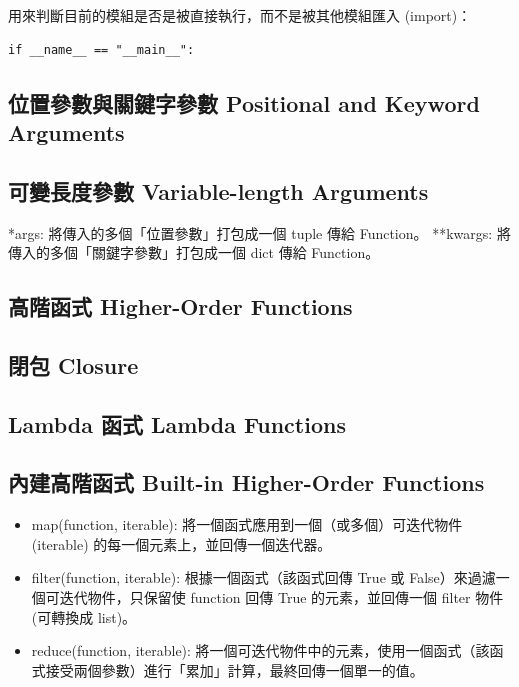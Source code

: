 \documentclass[a4paper,10pt,twocolumn,oneside]{article}
\begin{document}
用來判斷目前的模組是否是被直接執行，而不是被其他模組匯入 (import)：
\begin{verbatim}
if __name__ == "__main__":
\end{verbatim}
\subsection{位置參數與關鍵字參數 Positional and Keyword Arguments}


\subsection{可變長度參數 Variable-length Arguments}
*args: 將傳入的多個「位置參數」打包成一個 tuple 傳給 Function。
**kwargs: 將傳入的多個「關鍵字參數」打包成一個 dict 傳給 Function。


\subsection{高階函式 Higher-Order Functions}


\subsection{閉包 Closure}


\subsection{Lambda 函式 Lambda Functions}


\subsection{內建高階函式 Built-in Higher-Order Functions}
\begin{itemize}
    \item map(function, iterable): 將一個函式應用到一個（或多個）可迭代物件 (iterable) 的每一個元素上，並回傳一個迭代器。
    \item filter(function, iterable): 根據一個函式（該函式回傳 True 或 False）來過濾一個可迭代物件，只保留使 function 回傳 True 的元素，並回傳一個 filter 物件 (可轉換成 list)。
    \item reduce(function, iterable): 將一個可迭代物件中的元素，使用一個函式（該函式接受兩個參數）進行「累加」計算，最終回傳一個單一的值。
\end{itemize}

\end{document}
